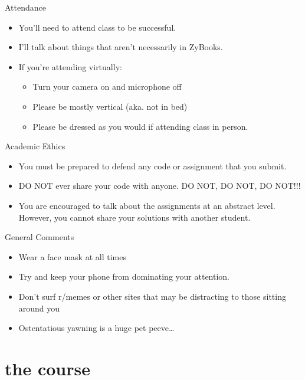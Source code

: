 \begin{frame}{Attendance}
\protect\hypertarget{attendance}{}
\begin{itemize}
\item
  You'll need to attend class to be successful.
\item
  I'll talk about things that aren't necessarily in ZyBooks.
\item
  If you're attending virtually:

  \begin{itemize}
  \tightlist
  \item
    Turn your camera on and microphone off
  \item
    Please be mostly vertical (aka. not in bed)
  \item
    Please be dressed as you would if attending class in person.
  \end{itemize}
\end{itemize}
\end{frame}

\begin{frame}{Academic Ethics}
\protect\hypertarget{academic-ethics}{}
\begin{itemize}
\tightlist
\item
  You must be prepared to defend any code or assignment that you
  submit.\\
\item
  DO NOT ever share your code with anyone. DO NOT, DO NOT, DO NOT!!!
\item
  You are encouraged to talk about the assignments at an abstract level.
  However, you cannot share your solutions with another student.
\end{itemize}
\end{frame}

\begin{frame}{General Comments}
\protect\hypertarget{general-comments}{}
\begin{itemize}
\tightlist
\item
  Wear a face mask at all times
\item
  Try and keep your phone from dominating your attention.
\item
  Don't surf r/memes or other sites that may be distracting to those
  sitting around you
\item
  Ostentatious yawning is a huge pet peeve\ldots{}
\end{itemize}
\end{frame}

\hypertarget{the-course}{%
\section{the course}\label{the-course}}

